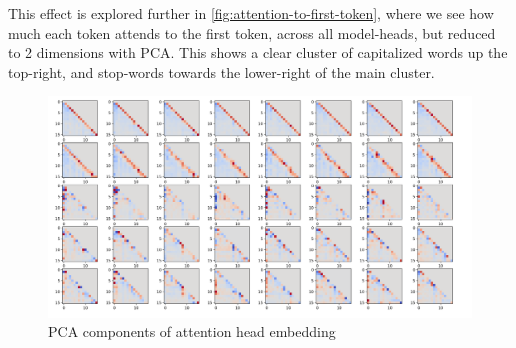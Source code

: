 \documentclass{article}
\begin{document}
This effect is explored further in \ref{fig:attention-to-first-token}, where we see how much each token attends to the first token, across all model-heads, but reduced to 2 dimensions with PCA. This shows a clear cluster of capitalized words up the top-right, and stop-words towards the lower-right of the main cluster.

\begin{figure}
    \includegraphics[width=\textwidth]{images/pca-components.png}
    \caption{PCA components of attention head embedding}
    \label{fig:pca-components}
\end{figure}
\end{document}
